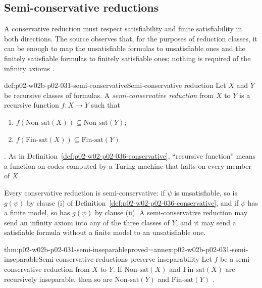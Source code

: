 \subsection{Semi-conservative reductions}
\label{sec:p02-w02b-p02-031-semi}

A conservative reduction must respect satisfiability and finite
satisfiability in both directions.  The source observes that, for the
purposes of reduction classes, it can be enough to map the unsatisfiable
formulas to unsatisfiable ones and the finitely satisfiable formulas to
finitely satisfiable ones; nothing is required of the infinity axioms
\cite[Sect.~2.1.2, p.~37]{BorgerGradelGurevich1997}.

\begin{hbdefinition}{def:p02-w02b-p02-031-semi-conservative}{Semi-conservative reduction}
Let \(X\) and \(Y\) be recursive classes of formulas.  A
\emph{semi-conservative reduction} from \(X\) to \(Y\) is a recursive function
\(f:X\to Y\) such that
\begin{enumerate}
\item \(f(\mathrm{Non\text{-}sat}(X))\subseteq\mathrm{Non\text{-}sat}(Y)\);
\item \(f(\mathrm{Fin\text{-}sat}(X))\subseteq\mathrm{Fin\text{-}sat}(Y)\)
\end{enumerate}
\cite[Sect.~2.1.2, Def.~2.1.38]{BorgerGradelGurevich1997}.  As in
Definition~\ref{def:p02-w02-p02-036-conservative}, ``recursive function''
means a function on codes computed by a Turing machine that halts on every
member of \(X\).
\end{hbdefinition}

Every conservative reduction is semi-conservative: if \(\psi\) is
unsatisfiable, so is \(g(\psi)\) by clause (i) of
Definition~\ref{def:p02-w02-p02-036-conservative}, and if \(\psi\) has a
finite model, so has \(g(\psi)\) by clause (ii).  A semi-conservative
reduction may send an infinity axiom into any of the three classes of \(Y\),
and it may send a satisfiable formula without a finite model to an
unsatisfiable one.

\begin{hbtheorem}{thm:p02-w02b-p02-031-semi-inseparable}{proved=annex:p02-w02b-p02-031-semi-inseparable}{Semi-conservative reductions preserve inseparability}
Let \(f\) be a semi-conservative reduction from \(X\) to \(Y\).  If
\(\mathrm{Non\text{-}sat}(X)\) and \(\mathrm{Fin\text{-}sat}(X)\) are
recursively inseparable, then so are \(\mathrm{Non\text{-}sat}(Y)\) and
\(\mathrm{Fin\text{-}sat}(Y)\)
\cite[Sect.~2.1.2, Exercise~2.1.40(1)]{BorgerGradelGurevich1997}.
\end{hbtheorem}


